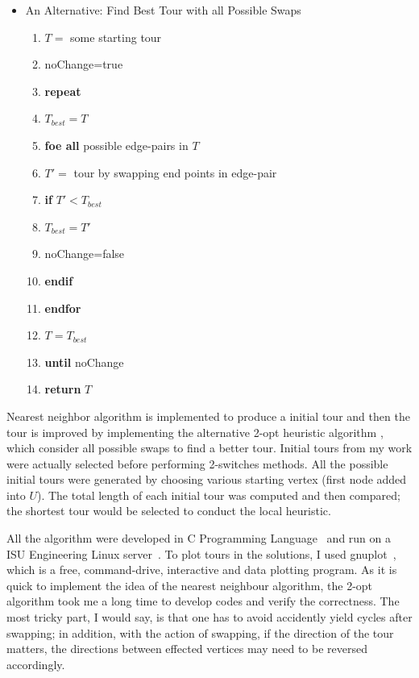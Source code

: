 \documentclass[11pt]{article}
\begin{document}
\begin{itemize}
  \item An Alternative: Find Best Tour with all Possible Swaps
\begin{enumerate}
  \item $T=$ some starting tour
  \item noChange=true
  \item \textbf{repeat}
  \item $T_{best}=T$
  \item \quad\textbf{foe all} possible edge-pairs in $T$
  \item \quad\quad $T'=$ tour by swapping end points in edge-pair
  \item \quad\quad\textbf{if} $T'<T_{best}$
  \item \quad\quad\quad $T_{best}=T'$
  \item \quad\quad\quad noChange=false
  \item \quad\quad\textbf{endif}
  \item \quad\textbf{endfor}
  \item \quad $T=T_{best}$
  \item \textbf{until} noChange
  \item \textbf{return} $T$
\end{enumerate}
\end{itemize}

Nearest neighbor algorithm is implemented to produce a initial tour and then the tour is improved by implementing the alternative 2-opt heuristic algorithm , which consider all possible swaps to find a better tour. Initial tours from my work were actually selected before performing 2-switches methods. All the possible initial tours were generated by choosing various starting vertex (first node added into $U$). The total length of each initial tour was computed and then compared; the shortest tour would be selected to conduct the local heuristic.

All the algorithm were developed in C Programming Language~\cite{C} and run on a ISU Engineering Linux server~\cite{Servers}. To plot tours in the solutions, I used gnuplot~\cite{Gnuplot}, which is a free, command-drive, interactive and data plotting program. As it is quick to implement the idea of the nearest neighbour algorithm, the 2-opt algorithm took me a long time to develop codes and verify the correctness. The most tricky part, I would say, is that one has to avoid accidently yield cycles after swapping; in addition, with the action of swapping, if the direction of the tour matters, the directions between effected vertices may need to be reversed accordingly.
\end{document}
